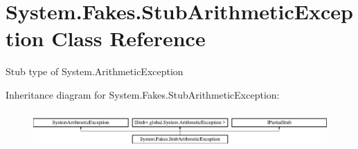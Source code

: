\hypertarget{class_system_1_1_fakes_1_1_stub_arithmetic_exception}{\section{System.\-Fakes.\-Stub\-Arithmetic\-Exception Class Reference}
\label{class_system_1_1_fakes_1_1_stub_arithmetic_exception}
}


Stub type of System.\-Arithmetic\-Exception 


Inheritance diagram for System.\-Fakes.\-Stub\-Arithmetic\-Exception\-:\begin{figure}[H]
\begin{center}
\leavevmode
\includegraphics[height=1.408805cm]{class_system_1_1_fakes_1_1_stub_arithmetic_exception}
\end{center}
\end{figure}
